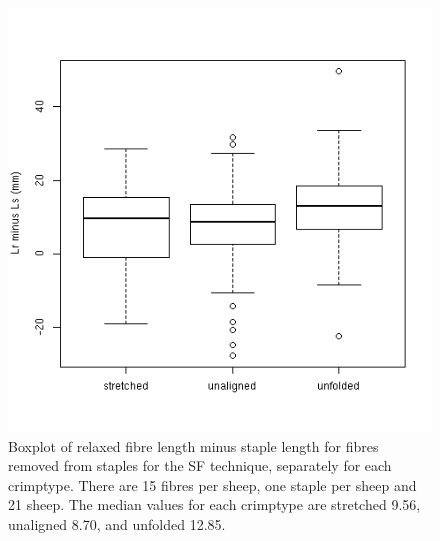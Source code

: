 %

\begin{figure}[!h]
  \centering
  \includegraphics[width=1.0\textwidth]{figLrminusLs.png}
  \caption{Boxplot of relaxed fibre length minus staple length for fibres removed from staples for the SF technique, separately for each crimptype. There are 15 fibres per sheep, one staple per sheep and 21 sheep. The median values for each crimptype are stretched 9.56, unaligned 8.70, and unfolded 12.85.}
\label{fig:LrminusLs}
\end{figure}

%

